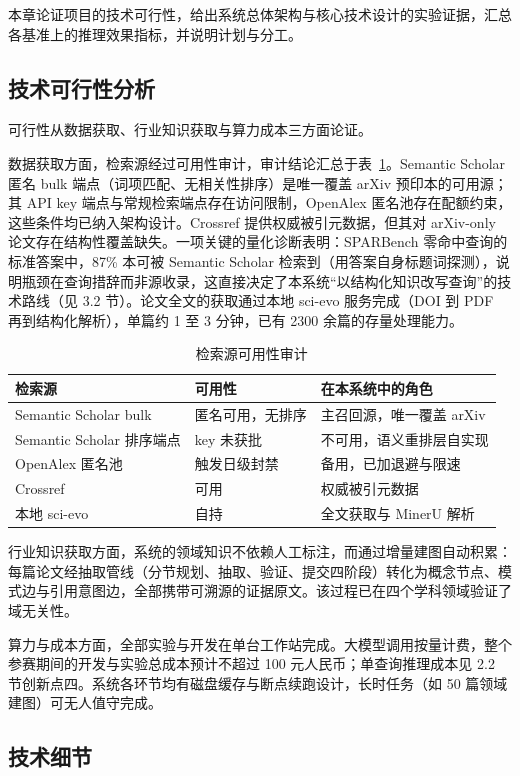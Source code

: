 \documentclass[12pt,a4paper]{ctexart}
\begin{document}
本章论证项目的技术可行性，给出系统总体架构与核心技术设计的实验证据，汇总各基准上的推理效果指标，并说明计划与分工。

\subsection{技术可行性分析}

可行性从数据获取、行业知识获取与算力成本三方面论证。

数据获取方面，检索源经过可用性审计，审计结论汇总于表~\ref{tab:src}。Semantic Scholar 匿名 bulk 端点（词项匹配、无相关性排序）是唯一覆盖 arXiv 预印本的可用源；其 API key 端点与常规检索端点存在访问限制，OpenAlex 匿名池存在配额约束，这些条件均已纳入架构设计。Crossref 提供权威被引元数据，但其对 arXiv-only 论文存在结构性覆盖缺失。一项关键的量化诊断表明：SPARBench 零命中查询的标准答案中，87\% 本可被 Semantic Scholar 检索到（用答案自身标题词探测），说明瓶颈在查询措辞而非源收录，这直接决定了本系统“以结构化知识改写查询”的技术路线（见 3.2 节）。论文全文的获取通过本地 sci-evo 服务完成（DOI 到 PDF 再到结构化解析），单篇约 1 至 3 分钟，已有 2300 余篇的存量处理能力。

\begin{table}[htbp]
\centering
\small
\caption{检索源可用性审计}
\label{tab:src}
\begin{tabularx}{\textwidth}{l X X}
\toprule
检索源 & 可用性 & 在本系统中的角色 \tabularnewline
\midrule
Semantic Scholar bulk & 匿名可用，无排序 & 主召回源，唯一覆盖 arXiv \tabularnewline
Semantic Scholar 排序端点 & key 未获批 & 不可用，语义重排层自实现 \tabularnewline
OpenAlex 匿名池 & 触发日级封禁 & 备用，已加退避与限速 \tabularnewline
Crossref & 可用 & 权威被引元数据 \tabularnewline
本地 sci-evo & 自持 & 全文获取与 MinerU 解析 \tabularnewline
\bottomrule
\end{tabularx}
\end{table}

行业知识获取方面，系统的领域知识不依赖人工标注，而通过增量建图自动积累：每篇论文经抽取管线（分节规划、抽取、验证、提交四阶段）转化为概念节点、模式边与引用意图边，全部携带可溯源的证据原文。该过程已在四个学科领域验证了域无关性。

算力与成本方面，全部实验与开发在单台工作站完成。大模型调用按量计费，整个参赛期间的开发与实验总成本预计不超过 100 元人民币；单查询推理成本见 2.2 节创新点四。系统各环节均有磁盘缓存与断点续跑设计，长时任务（如 50 篇领域建图）可无人值守完成。

\subsection{技术细节}
\end{document}
